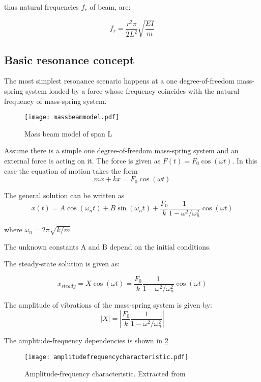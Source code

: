 thus natural frequencies $f_r$ of beam, are:

$$f_r = \frac{r^2 \pi}{2L^2}\sqrt{\frac{EI}{m}}$$

\subsection{Basic resonance concept}
The most simplest resonance scenario happens at a one degree-of-freedom mass-spring system loaded by a force whose frequency coincides with the natural frequency of mass-spring system.
\begin{figure}[h]
	\centering
	\texttt{[image: massbeammodel.pdf]}
	\caption{Mass beam model of span L}
	\label{fig:massbeammodel}
\end{figure}

Assume there is a simple one degree-of-freedom mass-spring system and an external force is acting on it. The force is given as $F(t)= F_0 \cos(\omega t)$. In this case the equation of motion takes the form
\begin{equation}
	m\ddot{x} + kx = F_0 \cos(\omega t)
\end{equation}

The general solution can be written as
\begin{equation}
	x(t) = A\cos(\omega_n t)+B\sin(\omega_n t) +\frac{F_0}{k}\frac{1}{1-\omega^2/\omega_n^2}\cos(\omega t)
\end{equation}

where $\omega_n = 2\pi\sqrt{k/m}$

The unknown constants A and B depend on the initial conditions.

The steady-state solution is given as:

\begin{equation}
	x_{steady}= X \cos(\omega t) = \frac{F_0}{k}\frac{1}{1-\omega^2/\omega_n^2}\cos(\omega t)
\end{equation}

The amplitude of vibrations of the mass-spring system is given by:
\begin{equation}
	|X|=|\frac{F_0}{k}\frac{1}{1-\omega^2/\omega_n^2}|
\end{equation}

The amplitude-frequency dependencies is shown in \ref{fig:amplitude-frequency-characteristic} 

\begin{figure}[h]
	\centering
	\texttt{[image: amplitudefrequencycharacteristic.pdf]}
	\caption{Amplitude-frequency characteristic. Extracted from \cite[2.2.2]{dynamicslecturenote}}
	\label{fig:amplitude-frequency-characteristic}
\end{figure}

